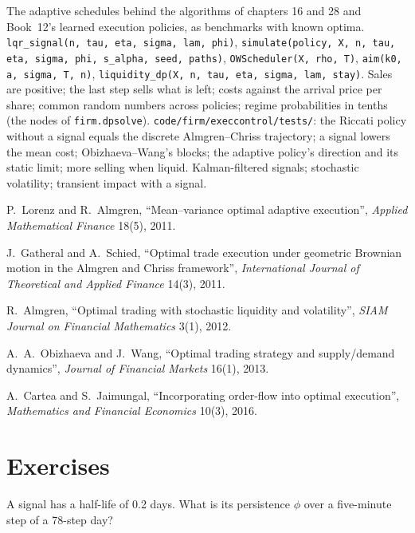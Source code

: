 \begin{build}
 The adaptive schedules behind the algorithms of chapters 16 and 28 and Book~12's learned execution policies, as benchmarks with known
optima.
 \texttt{lqr\_signal(n, tau, eta, sigma, lam, phi)}, \texttt{simulate(policy, X, n, tau, eta, sigma, phi, s\_alpha, seed, paths)},
\texttt{OWScheduler(X, rho, T)}, \texttt{aim(k0, a, sigma, T, n)}, \texttt{liquidity\_dp(X, n, tau, eta, sigma, lam, stay)}.
 Sales are positive; the last step sells what is left; costs against the arrival price per share; common random numbers across policies;
regime probabilities in tenths (the nodes of \texttt{firm.dpsolve}).
 \texttt{code/firm/execcontrol/tests/}: the Riccati policy without a signal equals the discrete Almgren--Chriss trajectory; a
signal lowers the mean cost; Obizhaeva--Wang's blocks; the adaptive policy's direction and its static limit; more selling when liquid.
 Kalman-filtered signals; stochastic volatility; transient impact with a signal.
\end{build}

\begin{omsources}
\item P.~Lorenz and R.~Almgren, ``Mean--variance optimal adaptive execution'', \emph{Applied Mathematical Finance} 18(5), 2011.
\item J.~Gatheral and A.~Schied, ``Optimal trade execution under geometric Brownian motion in the Almgren and Chriss framework'', \emph{International
Journal of Theoretical and Applied Finance} 14(3), 2011.
\item R.~Almgren, ``Optimal trading with stochastic liquidity and volatility'', \emph{SIAM Journal on Financial Mathematics} 3(1), 2012.
\item A.~A.~Obizhaeva and J.~Wang, ``Optimal trading strategy and supply/demand dynamics'', \emph{Journal of Financial Markets} 16(1), 2013.
\item A.~Cartea and S.~Jaimungal, ``Incorporating order-flow into optimal execution'', \emph{Mathematics and Financial Economics} 10(3), 2016.
\end{omsources}

\section{Exercises}

\begin{exercise}[$\star$]\label{exo:mx:beyond-almgren-chriss:1}
A signal has a half-life of 0.2 days. What is its persistence $\phi$ over a five-minute step of a 78-step day?
\end{exercise}

